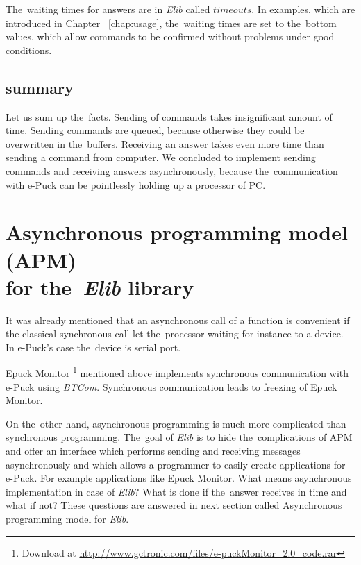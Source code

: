   \begin{definition}[Timeout]
  The~waiting times for answers are in {\it Elib} called $timeouts$.
  In examples, which are introduced in Chapter ~\ref{chap:usage}, the~waiting times are set to the~bottom values,
  which allow commands to be confirmed without problems under good conditions.
  \end{definition}
  
  \subsection*{summary} %
  Let us sum up the~facts. Sending of commands takes insignificant amount of time.
  Sending commands are queued, because otherwise they could be overwritten in the~buffers.
  Receiving an answer takes even more time than sending a command from computer.
  We concluded to implement sending commands and receiving answers asynchronously, because the~communication with e-Puck
  can be pointlessly holding up a processor of PC.

\section{Asynchronous programming model (APM)\\ for the~{\it Elib} library}
  \label{sec:apm}
  It was already mentioned that an asynchronous call of a function is convenient if the
  classical synchronous call let the~processor waiting for instance to a device.
  In e-Puck's case the~device is serial port. 
   
  Epuck Monitor \footnote{\small{Download at \url{http://www.gctronic.com/files/e-puckMonitor_2.0_code.rar}}}
  mentioned above implements synchronous communication with e-Puck using {\it BTCom}.
  Synchronous communication leads to freezing of Epuck Monitor. 

  On the~other hand, asynchronous programming is much more complicated than synchronous programming.
  The~goal of {\it Elib} is to hide the~complications of APM and offer an interface
  which performs sending and receiving messages asynchronously and
  which allows a programmer to easily create applications for e-Puck. For example applications like Epuck Monitor.
  What means asynchronous implementation in case of {\it Elib}? What is done if the~answer receives in time
  and what if not? These questions are answered in next section called Asynchronous programming model for {\it Elib}.

